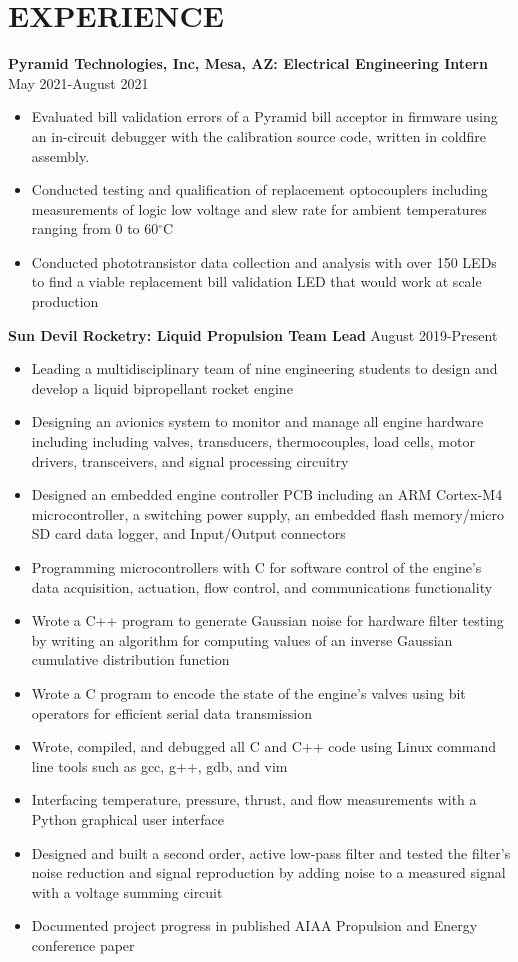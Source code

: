 \documentclass{article}
\begin{document}
\section{EXPERIENCE}
\textbf{Pyramid Technologies, Inc, Mesa, AZ: Electrical Engineering Intern}
\hfill 
\vspace{0.5em}
May 2021-August 2021
\begin{itemize}
\item{Evaluated bill validation errors of a Pyramid bill acceptor in firmware using an in-circuit debugger with the calibration source code, written in coldfire     assembly.}
\item{Conducted testing and qualification of replacement optocouplers including measurements of logic low voltage and slew rate for ambient temperatures ranging from 0 to 60$^{\circ}$C}
\item{Conducted phototransistor data collection and analysis with over 150 LEDs to find a viable replacement bill validation LED that would work at scale production}
\end{itemize}
\vspace{0.5em}
\textbf{Sun Devil Rocketry: Liquid Propulsion Team Lead}
\hfill
\vspace{0.5em}
August 2019-Present
\begin{itemize}
\item{Leading a multidisciplinary team of nine engineering students to design and develop a liquid bipropellant rocket engine}
	\item{Designing an avionics system to monitor and manage all engine hardware including including valves, transducers, thermocouples, load cells, motor drivers, transceivers, and signal processing circuitry}
\item{Designed an embedded engine controller PCB including an ARM Cortex-M4 microcontroller, a switching power supply, an embedded flash memory/micro SD card data logger, and Input/Output connectors}
	\item{Programming microcontrollers with C for software control of the engine's data acquisition, actuation, flow control, and communications functionality}
	\item{Wrote a C++ program to generate Gaussian noise for hardware filter testing by writing an algorithm for computing values of an inverse Gaussian cumulative distribution function}
	\item{Wrote a C program to encode the state of the engine's valves using bit operators for efficient serial data transmission}
	\item{Wrote, compiled, and debugged all C and C++ code using Linux command line tools such as gcc, g++, gdb, and vim}
	\item{Interfacing temperature, pressure, thrust, and flow measurements with a Python graphical user interface}
	\item{Designed and built a second order, active low-pass filter and tested the filter's noise reduction and signal reproduction by adding noise to a measured signal with a voltage summing circuit}
	\item{Documented project progress in published AIAA Propulsion and Energy conference paper}
\end{itemize}
\end{document}
